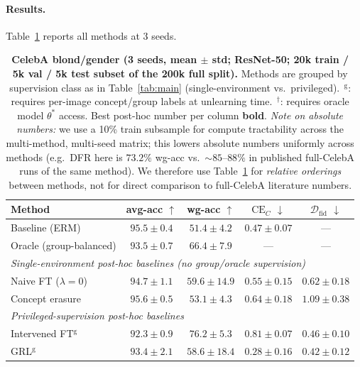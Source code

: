 \documentclass{article}
\newcommand{\CE}{\mathrm{CE}}
\newcommand{\Dfid}{\mathcal{D}_{\mathrm{fid}}}
\begin{document}
\paragraph{Results.}
Table~\ref{tab:celeba} reports all methods at 3 seeds.

\begin{table}[t]
\centering
\caption{%
  \textbf{CelebA blond/gender (3 seeds, mean $\pm$ std; ResNet-50;
  20k train / 5k val / 5k test subset of the 200k full split).}
  Methods are grouped by supervision class as in Table~\ref{tab:main}
  (single-environment vs.\ privileged).
  $^{\,\mathrm{g}}$: requires per-image concept/group labels at unlearning
  time. $^{\,\dagger}$: requires oracle model $\theta^*$ access.
  Best post-hoc number per column \textbf{bold}.
  \emph{Note on absolute numbers:} we use a 10\% train subsample for compute
  tractability across the multi-method, multi-seed matrix; this lowers
  absolute numbers uniformly across methods (e.g.\ DFR here is $73.2\%$
  wg-acc vs.\ $\sim\!85$--$88\%$ in published full-CelebA runs of the same
  method).  We therefore use Table~\ref{tab:celeba} for \emph{relative
  orderings} between methods, not for direct comparison to full-CelebA
  literature numbers.
}
\label{tab:celeba}
\smallskip
\small
\setlength{\tabcolsep}{4.5pt}
\begin{tabular}{lcccc}
\toprule
\textbf{Method} & avg-acc $\uparrow$ & wg-acc $\uparrow$ & $\CE_C$ $\downarrow$ & $\Dfid$ $\downarrow$ \\
\midrule
Baseline (ERM)                       & $95.5 \pm 0.4$ & $51.4 \pm 4.2$ & $0.47 \pm 0.07$ & --- \\
Oracle (group-balanced)              & $93.5 \pm 0.7$ & $66.4 \pm 7.9$ & --- & --- \\
\midrule
\multicolumn{5}{l}{\textit{Single-environment post-hoc baselines (no group/oracle supervision)}} \\
Naive FT ($\lambda{=}0$)             & $94.7 \pm 1.1$ & $59.6 \pm 14.9$ & $0.55 \pm 0.15$ & $0.62 \pm 0.18$ \\
Concept erasure                      & $\mathbf{95.6 \pm 0.5}$ & $53.1 \pm 4.3$ & $0.64 \pm 0.18$ & $1.09 \pm 0.38$ \\
\midrule
\multicolumn{5}{l}{\textit{Privileged-supervision post-hoc baselines}} \\
Intervened FT$^{\mathrm{g}}$         & $92.3 \pm 0.9$ & $\mathbf{76.2 \pm 5.3}$ & $0.81 \pm 0.07$ & $0.46 \pm 0.10$ \\
GRL$^{\mathrm{g}}$                   & $93.4 \pm 2.1$ & $58.6 \pm 18.4$ & $0.28 \pm 0.16$ & $0.42 \pm 0.12$ \\

\end{tabular}
\end{table}
\end{document}
